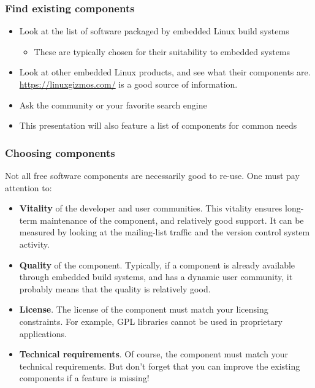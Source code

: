 \begin{frame}
  \frametitle{Find existing components}
  \begin{itemize}
  \item Look at the list of software packaged by embedded Linux build
    systems
    \begin{itemize}
    \item These are typically chosen for their suitability to embedded
      systems
    \end{itemize}
  \item Look at other embedded Linux products, and see what their
    components are.\\
    \url{https://linuxgizmos.com/} is a good source of information.
  \item Ask the community or your favorite search engine
  \item This presentation will also feature a list of components for
    common needs
  \end{itemize}
\end{frame}

\begin{frame}
  \frametitle{Choosing components}
  Not all free software components are necessarily good to
  re-use. One must pay attention to:
  \begin{itemize}
  \item {\bf Vitality} of the developer and user communities. This
    vitality ensures long-term maintenance of the component, and
    relatively good support. It can be measured by looking at the
    mailing-list traffic and the version control system activity.
  \item {\bf Quality} of the component. Typically, if a component is
    already available through embedded build systems, and has a
    dynamic user community, it probably means that the quality is
    relatively good.
  \item {\bf License}. The license of the component must match your
    licensing constraints. For example, GPL libraries cannot be used
    in proprietary applications.
  \item {\bf Technical requirements}. Of course, the component must
    match your technical requirements. But don't forget that you can
    improve the existing components if a feature is missing!
  \end{itemize}
\end{frame}

